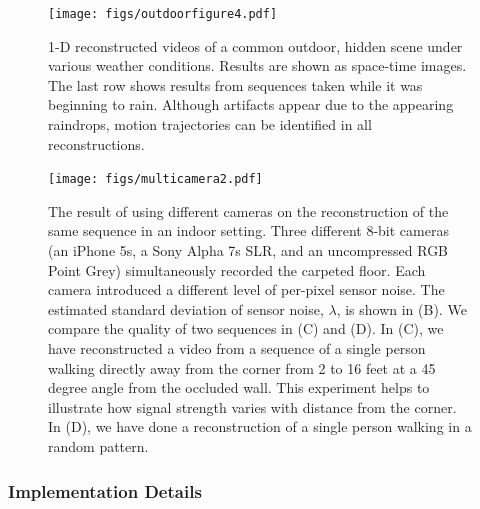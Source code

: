 \begin{figure}[tb]
\centering
\texttt{[image: figs/outdoorfigure4.pdf]}
\vspace{-.4in}
\caption{\label{fig:outdoorfigure4}  1-D reconstructed videos of a common outdoor, hidden scene under various weather conditions. Results are shown as space-time images. The last row shows results from sequences taken while it was beginning to rain. Although artifacts appear due to the appearing raindrops, motion trajectories can be identified in all reconstructions.}
\end{figure}


\begin{figure}[tb]
\centering
\texttt{[image: figs/multicamera2.pdf]}
\vspace{-.5in}
\caption{The result of using different cameras on the reconstruction of the same sequence in an indoor setting. Three different 8-bit cameras (an iPhone 5s, a Sony Alpha 7s SLR, and an uncompressed RGB Point Grey) simultaneously recorded the carpeted floor. Each camera introduced a different level of per-pixel sensor noise. 
The estimated standard deviation of sensor noise, $\lambda$, is shown in (B). 
We compare the quality of two sequences in (C) and (D).  In (C), we have reconstructed a video from a sequence of a single person walking directly away from the corner from 2 to 16 feet at a 45 degree angle from the occluded wall. This experiment helps to illustrate how signal strength varies with distance from the corner. In (D), we have done a reconstruction of a single person walking in a random pattern. \label{fig:multicamera}}
\vspace{-.2in}
\end{figure}

\vspace{-.1in}
\subsubsection{Implementation Details}
\label{sec:impdetail}

\vspace{-.1in}
